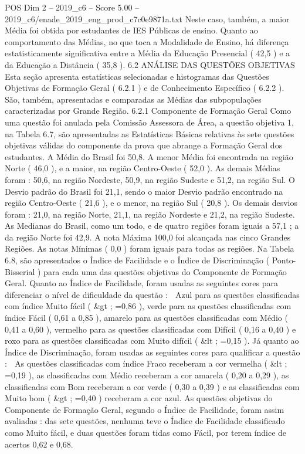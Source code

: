 \begin{textsample}{POS Dim 2 – 2019\_c6 – Score 5.00 – 2019\_c6/enade\_2019\_eng\_prod\_c7c0e9871a.txt}
Neste caso, também, a maior Média foi obtida por estudantes de IES Públicas de ensino.
Quanto ao comportamento das Médias, no que toca a Modalidade de Ensino, há diferença estatisticamente significativa entre a Média da Educação Presencial ( 42,5 ) e a da Educação a Distância ( 35,8 ). 6.2 ANÁLISE DAS QUESTÕES OBJETIVAS Esta seção apresenta estatísticas selecionadas e histogramas das Questões Objetivas de Formação Geral ( 6.2.1 ) e de Conhecimento Específico ( 6.2.2 ).
São, também, apresentadas e comparadas as Médias das subpopulações caracterizadas por Grande Região. 6.2.1 Componente de Formação Geral Como uma questão foi anulada pela Comissão Assessora de Área, a questão objetiva 1, na Tabela 6.7, são apresentadas as Estatísticas Básicas relativas às sete questões objetivas válidas do componente da prova que abrange a Formação Geral dos estudantes.
A Média do Brasil foi 50,8.
A menor Média foi encontrada na região Norte ( 46,0 ), e a maior, na região Centro-Oeste ( 52,0 ).
As demais Médias foram : 50,6, na região Nordeste, 50,9, na região Sudeste e 51,2, na região Sul.
O Desvio padrão do Brasil foi 21,1, sendo o maior Desvio padrão encontrado na região Centro-Oeste ( 21,6 ), e o menor, na região Sul ( 20,8 ).
Os demais desvios foram : 21,0, na região Norte, 21,1, na região Nordeste e 21,2, na região Sudeste.
As Medianas do Brasil, como um todo, e de quatro regiões foram iguais a 57,1 ; a da região Norte foi 42,9.
A nota Máxima 100,0 foi alcançada nas cinco Grandes Regiões.
As notas Mínimas ( 0,0 ) foram iguais para todas as regiões.
Na Tabela 6.8, são apresentados o Índice de Facilidade e o Índice de Discriminação ( Ponto-Bisserial ) para cada uma das questões objetivas do Componente de Formação Geral.
Quanto ao Índice de Facilidade, foram usadas as seguintes cores para diferenciar o nível de dificuldade da questão :  Azul para as questões classificadas com índice Muito fácil ( \&gt ; =0,86 ), verde para as questões classificadas com índice Fácil ( 0,61 a 0,85 ), amarelo para as questões classificadas com Médio ( 0,41 a 0,60 ), vermelho para as questões classificadas com Difícil ( 0,16 a 0,40 ) e roxo para as questões classificadas com Muito difícil ( \&lt ; =0,15 ).
Já quanto ao Índice de Discriminação, foram usadas as seguintes cores para qualificar a questão :  As questões classificadas com índice Fraco receberam a cor vermelha ( \&lt ; =0,19 ), as classificadas com Médio receberam a cor amarela ( 0,20 a 0,29 ), as classificadas com Bom receberam a cor verde ( 0,30 a 0,39 ) e as classificadas com Muito bom ( \&gt ; =0,40 ) receberam a cor azul.
As questões objetivas do Componente de Formação Geral, segundo o Índice de Facilidade, foram assim avaliadas : das sete questões, nenhuma teve o Índice de Facilidade classificado como Muito fácil, e duas questões foram tidas como Fácil, por terem índice de acertos 0,62 e 0,68.

\end{textsample}
